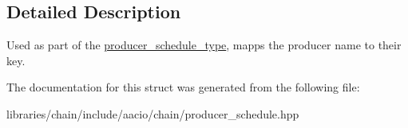 \subsection{Detailed Description}
Used as part of the \mbox{\hyperlink{structaacio_1_1chain_1_1producer__schedule__type}{producer\+\_\+schedule\+\_\+type}}, mapps the producer name to their key. 

The documentation for this struct was generated from the following file\+:\begin{DoxyCompactItemize}
\item 
libraries/chain/include/aacio/chain/producer\+\_\+schedule.\+hpp\end{DoxyCompactItemize}
